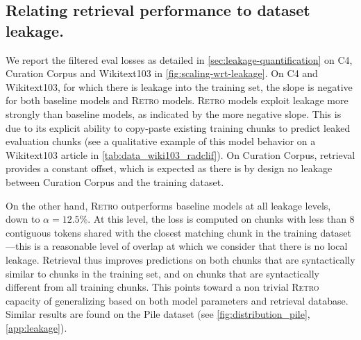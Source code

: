 \subsection{Relating retrieval performance to dataset leakage.}
\label{subsec-analysis-train-valid-leak}

We report the filtered eval losses as detailed in \autoref{sec:leakage-quantification} on C4, Curation Corpus and Wikitext103 in \autoref{fig:scaling-wrt-leakage}. On C4 and Wikitext103, for which there is leakage into the training set, the slope is negative for both baseline models and \textsc{Retro} models. \textsc{Retro} models exploit leakage more strongly than baseline models, as indicated by the more negative slope. This is due to its explicit ability to copy-paste existing training chunks to predict leaked evaluation chunks (see a qualitative example of this model behavior on a Wikitext103 article in \autoref{tab:data_wiki103_radclif}). On Curation Corpus, retrieval provides a constant offset, which is expected as there is by design no leakage between Curation Corpus and the training dataset.

On the other hand, \textsc{Retro} outperforms baseline models at all leakage levels, down to $\alpha = 12.5\%$. At this level, the loss is computed on chunks with less than $8$ contiguous tokens shared with the closest matching chunk in the training dataset---this is a reasonable level of overlap at which we consider that there is no local leakage. Retrieval thus improves predictions on both chunks that are syntactically similar to chunks in the training set, and on chunks that are syntactically different from all training chunks. This points toward a non trivial \textsc{Retro} capacity of generalizing based on both model parameters and retrieval database. Similar results are found on the Pile dataset (see \autoref{fig:distribution_pile}, \autoref{app:leakage}).

